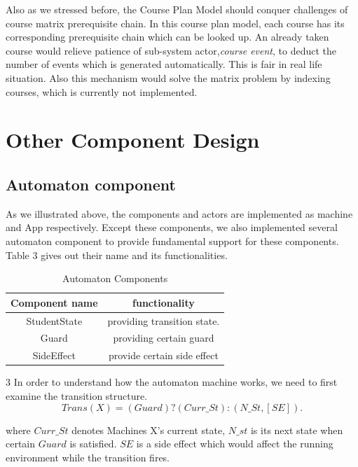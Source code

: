 \documentclass{sig-alternate}
\begin{document}
Also as we stressed before, the Course Plan Model should conquer challenges of course matrix prerequisite chain.  In this course plan model,  each course has its corresponding prerequisite chain which can be looked up. An already taken course would relieve patience of sub-system actor,{\em course event}, to deduct the number of events which is generated automatically.  This is fair in real life situation.  Also this mechanism would solve the matrix problem by indexing courses, which is currently not implemented. \\ 

\section{Other Component Design}
\subsection {Automaton component}
As we illustrated above, the components and actors are implemented as machine and App respectively. Except these components, we also implemented several automaton component to provide fundamental support for these components.  Table 3 gives out their name and its functionalities. 

\begin{table}[h]
\centering
\caption{Automaton Components  }
\begin{tabular}{|c|c|}\hline
Component name & functionality  \\
\hline
StudentState & providing transition state.\\
\hline
Guard & providing certain guard\\
\hline
SideEffect & provide certain side effect\\
\hline
\end{tabular}
\end{table}
3
In order to understand how the automaton machine works, we need to first examine the transition structure. \\
\begin{equation}
Trans(X)= (Guard)?(Curr\_St ):(N\_St, [SE]). 
\end{equation}

where $Curr\_St$ denotes Machines X's current state, $N\_st$ is its next state when certain $Guard$ is satisfied.  $SE$ is a side effect which would affect the running environment while the transition fires.  \\
\end{document}
